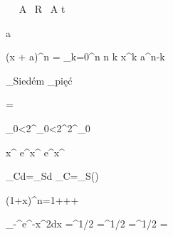 
\startformula
   \  \ \dot A \ \dot R  \ {\bi\dot A \check t} 
  \    \ \mathbf{\acute \imath}
\stopformula

\startformula
  \langle a \rangle \left\langle {} \right\rangle
  \left\langle {} \right\rangle
\stopformula

\startformula
  (x + a)^n = \sum_{k=0}^n {n \choose k} x^k a^{n-k}
\stopformula

\startformula
 _{\rm Siedém}
  _{\rm pięć}
\stopformula

\startformula
  =
\stopformula

\startformula
 \aleph_{0}<2^{\aleph_0}<2^{2^{\aleph_0}}
\stopformula

\startformula
x^{\alpha} e^{\beta x^{\gamma} e^{\delta x^{\epsilon}}}
\stopformula

\startformula
 \oint_C\cdot d=\int_S\mathbf{\nabla}\times{}\cdot d\qquad
 \oint_C\cdot{}=\iint_S(\nabla\times{})\,
\stopformula

\startformula
 (1+x)^n=1+++\cdots
\stopformula

\startformula
\startmathalignment
 \int_{-\infty}^\infty e^{-x^2}dx \NC =\NC  {}^{1/2} \NR
 \NC =\NC {}^{1/2}\NR
 \NC =\NC {}^{1/2}\NR
 \NC =\NC \sqrt{\pi}
\stopmathalignment
\stopformula

\endinput